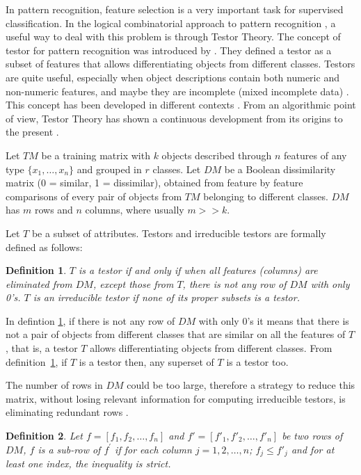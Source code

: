 \documentclass[authoryear,preprint,review,12pt]{elsarticle}
\newtheorem{definition}{Definition}
\begin{document}
In pattern recognition, feature selection is a very important task for supervised classification. In the logical
 combinatorial approach to pattern recognition \citep{R5}, a useful
way to deal with this problem is through Testor Theory. The concept of testor for pattern recognition was
introduced by \cite{R12}. They defined a testor as a subset of features that allows
differentiating objects from different classes. Testors are quite useful, especially when object descriptions
contain both numeric and non-numeric features, and maybe they are incomplete (mixed incomplete data)
\citep{R5}. This concept has been developed in different contexts \citep{R1}. From an 
algorithmic point of view, Testor Theory has shown a continuous development from its origins to the present 
\citep{R31,R13,R23}.

Let $TM$ be a training matrix with $k$ objects described through $n$
features of any type $\{x_{1},\ldots,x_{n}\}$ and grouped in $r$
classes. Let $DM$ be a Boolean dissimilarity matrix (0 = similar, 1 =
dissimilar), obtained from feature by feature comparisons of every
pair of objects from $TM$ belonging to different classes. $DM$ has
$m$ rows and $n$ columns, where usually $m>>k$.

Let $T$ be a subset of attributes. Testors and irreducible testors are formally defined as follows:

\begin{definition} \label{def1}
$T$ is a testor if and only if when all
features (columns) are eliminated from $DM$, except those from $T$, there is
not any row of $DM$ with only 0's. $T$ is an irreducible testor if none of its proper subsets is a testor.
\end{definition}

In defintion \ref{def1}, if there is not any row of $DM$ with only
0's it means that there is not a pair of objects from different
classes that are similar on all the features of $T$, that is, a
testor $T$ allows differentiating objects from different
classes. From definition~\ref{def1}, if $T$ is a testor then, any superset of $T$ is a testor too.

The number of rows in $DM$ could be too large, therefore a strategy to reduce this matrix, without losing
relevant information for computing irreducible testors, is eliminating redundant rows \citep{R1}.

\begin{definition}
Let $f=[f_1, f_2, \dots , f_n]$ and $f'=[f'_1, {f'}_2, \dots , {f'}_n]$ be two rows of $DM$, $f$ 
is a sub-row of $f^{'}$ if for each column $j=1,2,\dots ,n$;  $f_{j} \le f'_{j}$ and for at least one index, the 
inequality is strict.
\end{definition}
\end{document}
